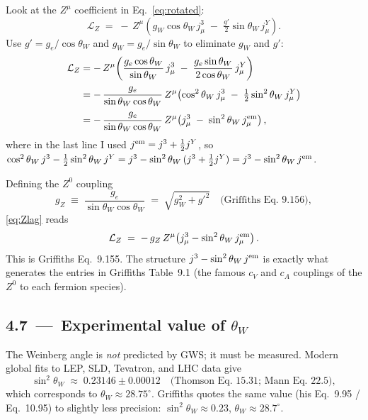 \documentclass[11pt]{article}
\begin{document}
\begin{stepbox}[title=Step 4.6: Use the consistency relation to simplify the $Z$ piece]
Look at the $Z^\mu$ coefficient in Eq.~\eqref{eq:rotated}:
\[
\mathcal{L}_Z \;=\; -\,Z^\mu \!\left( g_W \cos\theta_W \, j^3_\mu \;-\; \tfrac{g'}{2} \sin\theta_W \, j^Y_\mu \right) .
\]
Use $g' = g_e/\cos\theta_W$ and $g_W = g_e/\sin\theta_W$ to eliminate $g_W$ and $g'$:
\begin{align}
\mathcal{L}_Z
&= -\,Z^\mu \!\left( \frac{g_e \cos\theta_W}{\sin\theta_W}\, j^3_\mu \;-\; \frac{g_e \sin\theta_W}{2 \cos\theta_W}\, j^Y_\mu \right) \notag\\[2pt]
&= -\,\frac{g_e}{\sin\theta_W \cos\theta_W}\, Z^\mu \!\left( \cos^2\theta_W\, j^3_\mu \;-\; \tfrac{1}{2} \sin^2\theta_W\, j^Y_\mu \right) \notag\\[2pt]
&= -\,\frac{g_e}{\sin\theta_W \cos\theta_W}\, Z^\mu \!\left( j^3_\mu \;-\; \sin^2\theta_W\, j^{\rm em}_\mu \right),
\label{eq:Zlag}
\end{align}
where in the last line I used $j^{\rm em} = j^3 + \tfrac{1}{2}j^Y$, so
$\cos^2\theta_W\, j^3 - \tfrac{1}{2}\sin^2\theta_W\, j^Y = j^3 - \sin^2\theta_W\,(j^3 + \tfrac{1}{2}j^Y) = j^3 - \sin^2\theta_W\, j^{\rm em}$.

Defining the $Z^0$ coupling
\[
g_Z \;\equiv\; \frac{g_e}{\sin\theta_W \cos\theta_W} \;=\; \sqrt{g_W^2 + g'^2}
\quad\text{(Griffiths Eq.~9.156)},
\]
\eqref{eq:Zlag} reads
\[
\mathcal{L}_Z \;=\; -\,g_Z\, Z^\mu \!\left( j^3_\mu - \sin^2\theta_W\, j^{\rm em}_\mu \right) .
\]
This is Griffiths Eq.~9.155. The structure $j^3 - \sin^2\theta_W\, j^{\rm em}$ is exactly what
generates the entries in Griffiths Table~9.1 (the famous $c_V$ and $c_A$ couplings of the
$Z^0$ to each fermion species).
\end{stepbox}

\subsection*{4.7 \,---\, Experimental value of $\theta_W$}

\begin{conceptbox}
The Weinberg angle is \emph{not} predicted by GWS; it must be measured. Modern global fits
to LEP, SLD, Tevatron, and LHC data give
\[
\sin^2\theta_W \;\approx\; 0.23146 \pm 0.00012
\quad\text{(Thomson Eq.~15.31; Mann Eq.~22.5)},
\]
which corresponds to $\theta_W \approx 28.75^\circ$. Griffiths quotes the same value (his
Eq.~9.95 / Eq.~10.95) to slightly less precision: $\sin^2\theta_W \approx 0.23$,
$\theta_W \approx 28.7^\circ$.
\end{conceptbox}
\end{document}

